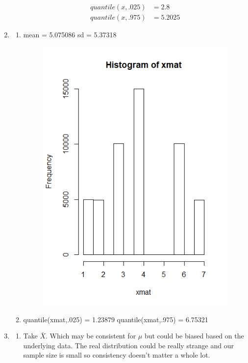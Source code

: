 \documentclass{article}
\begin{document}
\begin{enumerate}
\begin{enumerate}
	\begin{equation*}
	\begin{split}
	quantile(x,.025) &= 2.8 \\
	quantile(x,.975)&= 5.2025 
	\end{split}
	\end{equation*}
	\end{enumerate}
\item
	\begin{enumerate}
	\item
	mean = 5.075086
	sd = 5.37318
		\begin{figure} [H]
		\includegraphics[scale = .5]{histsuicidenon.png}
		\end{figure}
	\item 
	quantile(xmat,.025) = 1.23879
	quantile(xmat,.975) = 6.75321
	\end{enumerate}
\item
	\begin{enumerate}
	\item
	Take $\bar{X}$. Which may be consistent for $\mu$ but could be biased based on the underlying data. The real distribution could be really strange and our sample size is small so consistency doesn't matter a whole lot. 

	\end{enumerate}
\end{enumerate}
\end{document}
